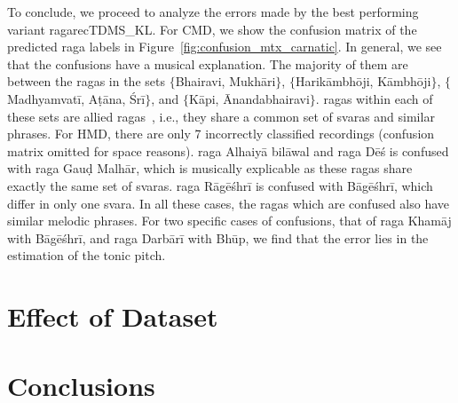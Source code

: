 

To conclude, we proceed to analyze the errors made by the best performing variant \acrshort{ragarecTDMS_KL}. For  CMD, we show the confusion matrix of the predicted \gls{raga} labels in Figure~\ref{fig:confusion_mtx_carnatic}. In general, we see that the confusions have a musical explanation. The majority of them are between the \glspl{raga} in the sets $\lbrace$Bhairavi, Mukh\={a}ri$\rbrace$, $\lbrace$Harik\={a}mbh\={o}ji, K\={a}mbh\={o}ji$\rbrace$, $\lbrace$Madhyamvat\={i}, A\d{t}\={a}na, \'Sr\={i}$\rbrace$, and $\lbrace$K\={a}pi, \={A}nandabhairavi$\rbrace$. \Glspl{raga} within each of these sets are allied \glspl{raga}~\cite{Viswanathan2004}, i.e., they share a common set of svaras and similar phrases. For HMD, there are only 7 incorrectly classified recordings (confusion matrix omitted for space reasons). \Gls{raga} Alhaiy\={a} bil\={a}wal and \gls{raga} D\={e}\'{s} is confused with \gls{raga} Gau\d{d} Malh\={a}r, which is musically explicable as these \glspl{raga} share exactly the same set of svaras. \Gls{raga} R\={a}g\={e}\'{s}hr\={i} is confused with B\={a}g\={e}\'{s}hr\={i}, which differ in only one svara. In all these cases, the \glspl{raga} which are confused also have similar melodic phrases. For two specific cases of confusions, that of \gls{raga}  Kham\={a}j with B\={a}g\={e}\'{s}hr\={i}, and \gls{raga} Darb\={a}r\={i} with Bh\={u}p, we find that the error lies in the estimation of the tonic pitch.


\section{Effect of Dataset}
\label{}

\section{Conclusions}
\label{sec:conclusions_raga_recognition}




